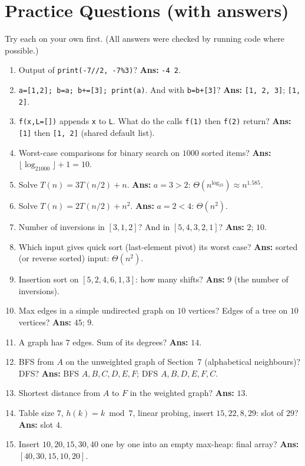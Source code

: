 \documentclass[11pt,a4paper]{article}
\newcommand{\py}[1]{\texttt{#1}}
\begin{document}
\section{Practice Questions (with answers)}
Try each on your own first. (All answers were checked by running code where possible.)
\begin{enumerate}[leftmargin=*,itemsep=4pt]
\item Output of \py{print(-7//2, -7\%3)}? \hfill \textbf{Ans: } \py{-4 2}.
\item \py{a=[1,2]; b=a; b+=[3]; print(a)}. And with \py{b=b+[3]}? \hfill \textbf{Ans: } \py{[1, 2, 3]}; \py{[1, 2]}.
\item \py{f(x,L=[])} appends \py{x} to \py{L}. What do the calls \py{f(1)} then \py{f(2)} return? \hfill \textbf{Ans: } \py{[1]} then \py{[1, 2]} (shared default list).
\item Worst-case comparisons for binary search on $1000$ sorted items? \hfill \textbf{Ans: } $\lfloor\log_21000\rfloor+1=10$.
\item Solve $T(n)=3T(n/2)+n$. \hfill \textbf{Ans: } $a=3>2$: $\Theta(n^{\log_23})\approx n^{1.585}$.
\item Solve $T(n)=2T(n/2)+n^2$. \hfill \textbf{Ans: } $a=2<4$: $\Theta(n^2)$.
\item Number of inversions in $[3,1,2]$? And in $[5,4,3,2,1]$? \hfill \textbf{Ans: } $2$; $10$.
\item Which input gives quick sort (last-element pivot) its worst case? \hfill \textbf{Ans: } sorted (or reverse sorted) input: $\Theta(n^2)$.
\item Insertion sort on $[5,2,4,6,1,3]$: how many shifts? \hfill \textbf{Ans: } $9$ (the number of inversions).
\item Max edges in a simple undirected graph on $10$ vertices? Edges of a tree on $10$ vertices? \hfill \textbf{Ans: } $45$; $9$.
\item A graph has $7$ edges. Sum of its degrees? \hfill \textbf{Ans: } $14$.
\item BFS from $A$ on the unweighted graph of Section~7 (alphabetical neighbours)? DFS? \hfill \textbf{Ans: } BFS $A,B,C,D,E,F$; DFS $A,B,D,E,F,C$.
\item Shortest distance from $A$ to $F$ in the weighted graph? \hfill \textbf{Ans: } $13$.
\item Table size $7$, $h(k)=k\bmod7$, linear probing, insert $15,22,8,29$: slot of $29$? \hfill \textbf{Ans: } slot $4$.
\item Insert $10,20,15,30,40$ one by one into an empty max-heap: final array? \hfill \textbf{Ans: } $[40,30,15,10,20]$.

\end{enumerate}
\end{document}
